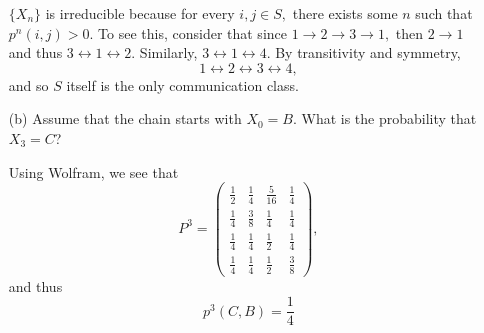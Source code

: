 \documentclass[11pt]{article}
\begin{document}
\begin{problem}
\begin{enumerate}
\begin{solution}
\begin{center}
\end{center}
$\{X_n\}$ is irreducible because for every $i,j \in S,$ there exists some $n$ such that $p^n(i,j) >0.$ To see this, consider that since $1\to 2 \to 3 \to 1,$ then $2\to 1$ and thus $3\leftrightarrow 1\leftrightarrow2.$ Similarly, $3\leftrightarrow1 \leftrightarrow4.$ By transitivity and symmetry, 
\[1 \leftrightarrow 2\leftrightarrow 3\leftrightarrow 4,\] and so $S$ itself is the only communication class.
    \end{solution}
    \item[(b)] Assume that the chain starts with \( X_0 = B \). What is the probability that \( X_3 = C \)?
\begin{solution}
    Using Wolfram, we see that 
    \[P^3 = 
\begin{pmatrix}
\frac{1}{2} & \frac{1}{4} & \frac{5}{16} & \frac{1}{4} \\
\frac{1}{4} & \frac{3}{8} & \frac{1}{4} & \frac{1}{4} \\
\frac{1}{4} & \frac{1}{4} & \frac{1}{2} & \frac{1}{4} \\
\frac{1}{4} & \frac{1}{4} & \frac{1}{2} & \frac{3}{8}
\end{pmatrix}
,\] and thus 
\[\boxed{p^3(C, B)} = \frac{1}{4}\]


\end{solution}
\end{enumerate}
\end{problem}
\end{document}
